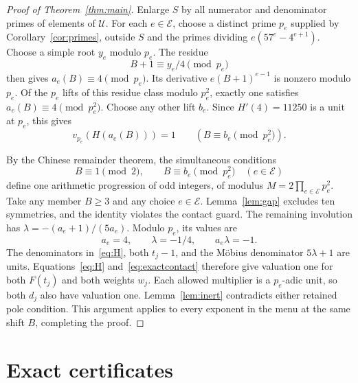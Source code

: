 \documentclass[11pt,a4paper]{article}
\begin{document}
\begin{proof}[Proof of Theorem~\ref{thm:main}]
Enlarge $S$ by all numerator and denominator primes of elements of
$\mathcal U$. For each $e\in\mathcal E$, choose a distinct prime
$p_e$ supplied by Corollary~\ref{cor:primes}, outside $S$ and the
primes dividing $e(57^e-4^{e+1})$. Choose a simple root $y_e$ modulo
$p_e$. The residue
\[
                        B+1\equiv y_e/4\pmod{p_e}
\]
then gives $a_e(B)\equiv4\pmod{p_e}$. Its derivative
$e(B+1)^{e-1}$ is nonzero modulo $p_e$. Of the $p_e$ lifts of
this residue class modulo $p_e^2$, exactly one satisfies
$a_e(B)\equiv4\pmod{p_e^2}$. Choose any other lift $b_e$.
Since $H'(4)=11250$ is a unit at $p_e$, this gives
\begin{equation}\label{eq:exactcontact}
               v_{p_e}(H(a_e(B)))=1
               \qquad(B\equiv b_e\pmod{p_e^2}).
\end{equation}

By the Chinese remainder theorem, the simultaneous conditions
\[
             B\equiv1\pmod2,\qquad
             B\equiv b_e\pmod{p_e^2}\quad(e\in\mathcal E)
\]
define one arithmetic progression of odd integers, of modulus
$M=2\prod_{e\in\mathcal E}p_e^2$.
Take any member $B\ge3$ and any choice $e\in\mathcal E$.
Lemma~\ref{lem:gap} excludes ten symmetries, and the identity
violates the contact guard. The remaining involution has
$\lambda=-(a_e+1)/(5a_e)$. Modulo $p_e$, its values are
\[
                     a_e=4,\qquad \lambda=-1/4,
                     \qquad a_e\lambda=-1.
\]
The denominators in~\eqref{eq:H}, both $t_j-1$, and the M\"obius
denominator $5\lambda+1$ are units. Equations~\eqref{eq:H}
and~\eqref{eq:exactcontact} therefore give valuation one for both
$F(t_j)$ and both weights $w_j$. Each allowed multiplier is a
$p_e$-adic unit, so both $d_j$ also have valuation one.
Lemma~\ref{lem:inert} contradicts either retained pole condition.
This argument applies to every exponent in the menu at the same
shift $B$, completing the proof.
\end{proof}

\section{Exact certificates}
\end{document}
